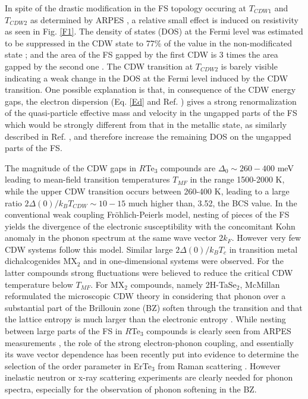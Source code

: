 In spite of the drastic modification in the FS topology occuring at
$T_{CDW1}$ and $T_{CDW2}$ as determined by ARPES \cite{Brouet08}, a
relative small effect is induced on resistivity as seen in Fig.
\ref{F1}.  The density of states (DOS) at the Fermi level was
estimated to be suppressed in the CDW state to 77\% of the value in
the non-modificated state \cite{Brouet08,Pfuner10}; and the area of
the FS gapped by the first CDW is 3 times the area gapped by the
second one \cite{Moore10,Pfuner10}. The CDW transition at $T_{CDW2}$
is barely visible indicating a weak change in the DOS at the Fermi
level induced by the CDW transition. One possible explanation is
that, in consequence of the CDW energy gaps, the electron dispersion
(Eq. \ref{Ed} and Ref. \cite{CommentED}) gives a strong
renormalization of the quasi-particle effective mass and velocity in
the ungapped parts of the FS which would be strongly different from
that in the metallic state, as similarly described in Ref.
\cite{PDG2008}, and therefore increase the remaining DOS on the
ungapped parts of the FS.

The magnitude of the CDW gaps in $R$Te$_3$ compounds are
$\Delta_0\sim260-400$ meV leading to mean-field transition
temperatures $T_{MF}$ in the range 1500-2000 K, while the upper CDW
transition occurs between 260-400 K, leading to a large ratio
$2\Delta(0)/k_BT_{CDW}\sim10-15$ much higher than, 3.52, the BCS
value. In the conventional weak coupling Fr\"{o}hlich-Peierls model,
nesting of pieces of the FS yields the divergence of the electronic
susceptibility with the concomitant Kohn anomaly in the phonon
spectrum at the same wave vector $2k_F$. However very few CDW
systems follow this model. Similar large $2\Delta(0)/k_BT_c$ in
transition metal dichalcogenides MX$_2$ \cite{Wilson75} and in
one-dimensional systems \cite{Monceau12} were observed. For the
latter compounds strong fluctuations were believed to reduce the
critical CDW temperature below $T_{MF}$. For MX$_2$ compounds,
namely 2H-TaSe$_2$, McMillan reformulated the microscopic CDW theory
in considering that phonon over a substantial part of the Brillouin
zone (BZ) soften through the transition and that the lattice entropy
is much larger than the electronic entropy \cite{McMillan77}. While
nesting between large parts of the FS in $R$Te$_3$ compounds is
clearly seen from ARPES measurements \cite{Brouet08}, the role of
the strong electron-phonon coupling, and essentially its wave vector
dependence has been recently put into evidence to determine the
selection of the order parameter in ErTe$_3$ from Raman scattering
\cite{Eiter13}. However inelastic neutron or x-ray scattering
experiments are clearly needed for phonon spectra, especially for
the observation of phonon softening in the BZ.

